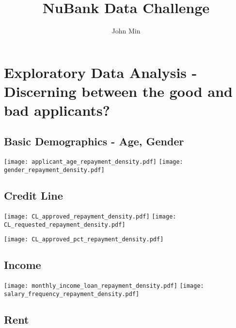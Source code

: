 \documentclass[a4paper, landscape]{article}
\begin{document}
\title{NuBank Data Challenge}

\author{John Min}
\maketitle

\tableofcontents

\graphicspath{ {/home/lj/ML/NuBank/Plots/} }

\newpage

\section{Exploratory Data Analysis - Discerning between the good and bad applicants?}

\subsection{Basic Demographics - Age, Gender}
\vspace{40mm}
\begin{center}
\texttt{[image: applicant\_age\_repayment\_density.pdf]}
\texttt{[image: gender\_repayment\_density.pdf]}
\end{center}

\subsection{Credit Line}
\begin{center}
\texttt{[image: CL\_approved\_repayment\_density.pdf]}
\texttt{[image: CL\_requested\_repayment\_density.pdf]}
\end{center}
\centerline{\texttt{[image: CL\_approved\_pct\_repayment\_density.pdf]}
}

\newpage

\subsection{Income}
\vspace{40mm}
\begin{center}
\texttt{[image: monthly\_income\_loan\_repayment\_density.pdf]}
\texttt{[image: salary\_frequency\_repayment\_density.pdf]}
\end{center}

\newpage
\subsection{Rent}
\end{document}
